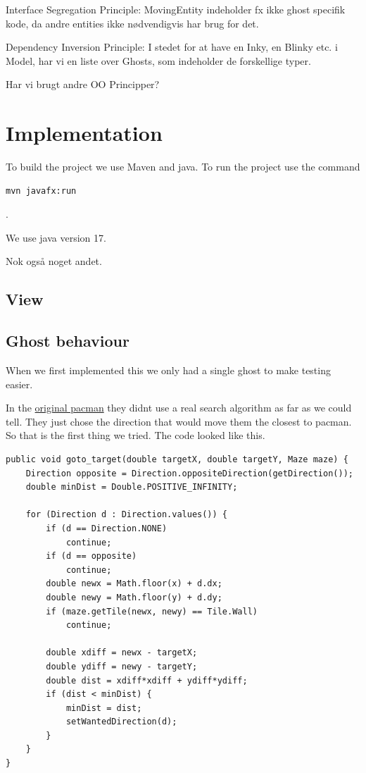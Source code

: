 \documentclass[a4paper,12pt]{article}
\begin{document}
Interface Segregation Principle: MovingEntity indeholder fx ikke ghost specifik kode, da andre entities ikke nødvendigvis har brug for det.

Dependency Inversion Principle: I stedet for at have en Inky, en Blinky etc. i Model, har vi en liste over Ghosts, som indeholder de forskellige typer.


Har vi brugt andre OO Principper?


\section{Implementation}

To build the project we use Maven and java. To run the project use the command
\begin{verbatim}
mvn javafx:run
\end{verbatim}.

We use java version 17.

Nok også noget andet.
\subsection{View}

\subsection{Ghost behaviour}
When we first implemented this we only had a single ghost to make testing easier.

In the \href{https://github.com/mburkley/pacman-c/blob/main/pacman.c#L11993}{original pacman} they didnt use a real search algorithm as far as we could tell. %
They just chose the direction that would  move them the closest to pacman. So that is the first thing we tried.
The code looked like this.
\begin{verbatim}
public void goto_target(double targetX, double targetY, Maze maze) {
    Direction opposite = Direction.oppositeDirection(getDirection());
    double minDist = Double.POSITIVE_INFINITY;

    for (Direction d : Direction.values()) {
        if (d == Direction.NONE)
            continue;
        if (d == opposite)
            continue;
        double newx = Math.floor(x) + d.dx;
        double newy = Math.floor(y) + d.dy;
        if (maze.getTile(newx, newy) == Tile.Wall)
            continue;

        double xdiff = newx - targetX;
        double ydiff = newy - targetY;
        double dist = xdiff*xdiff + ydiff*ydiff;
        if (dist < minDist) {
            minDist = dist;
            setWantedDirection(d);
        }
    }
}
\end{verbatim}
\end{document}

